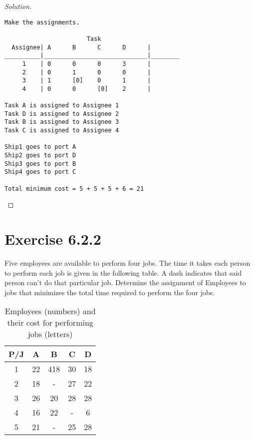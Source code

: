 \documentclass[titlepage, letterpaper, fleqn]{article}
\renewcommand\qedsymbol{\(\blacksquare\)}
\newenvironment{solution}
{\renewcommand\qedsymbol{$\square$}\begin{proof}[Solution]}
{\end{proof}}
\begin{document}
\begin{solution}
\begin{lstlisting}[basicstyle=\tiny]
Make the assignments.

                       Task
  Assignee| A      B      C      D      |
__________|_____________________________|________
     1    | 0      0      0      3      | 
     2    | 0      1      0      0      | 
     3    | 1      [0]    0      1      | 
     4    | 0      0      [0]    2      | 

Task A is assigned to Assignee 1
Task D is assigned to Assignee 2
Task B is assigned to Assignee 3
Task C is assigned to Assignee 4

Ship1 goes to port A
Ship2 goes to port D
Ship3 goes to port B
Ship4 goes to port C

Total minimum cost = 5 + 5 + 5 + 6 = 21
\end{lstlisting}
\end{solution}

\section{Exercise 6.2.2}
{\large Five employees are available to perform four jobs.
The time it takes each person to perform each job is given in the following table.
A dash indicates that said person can't do that particular job.
Determine the assignment of Employees to jobs that minimizes the total time required to perform the four jobs.}

\begin{table}[h!]
\centering
\begin{tabular}{@{}ccccc@{}}
\toprule
P/J & A  & B   & C  & D  \\ \midrule
1   & 22 & 418 & 30 & 18 \\
2   & 18 & -   & 27 & 22 \\
3   & 26 & 20  & 28 & 28 \\
4   & 16 & 22  & -  & 6  \\
5   & 21 & -   & 25 & 28 \\ \bottomrule
\end{tabular}
\caption{Employees (numbers) and their cost for performing jobs (letters)}
\label{tab:6_2_2}
\end{table}
\end{document}
